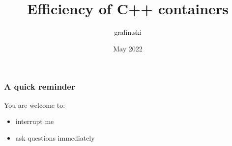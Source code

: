 \documentclass[aspectratio=169]{beamer}
\title[%
\texttt{\textcolor{clGray}{C++ Friends} %
\textcolor{clCodeBlue}{\#20}\textcolor{clGray}{~::~}\textcolor{clCodeBlue}{EfficiencyOfContainers}}%
]{%
Efficiency of C++ containers%
}
\author{gralin.ski}
\date{May 2022}
\begin{document}
{
\begin{frame}
\titlepage{}
\end{frame}
}

\begin{frame}
\frametitle{A quick reminder}
You are welcome to:
\begin{itemize}
  \item{interrupt me}
  \item{ask questions immediately}
\end{itemize}
\end{frame}
\end{document}
